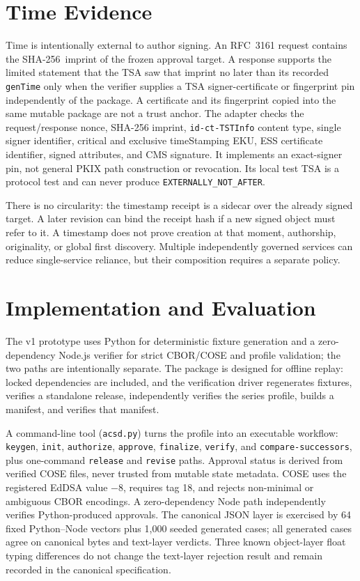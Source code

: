 \documentclass[11pt]{article}
\newcommand{\sha}{\textsf{SHA-256}}
\begin{document}
\section{Time Evidence}

Time is intentionally external to author signing. An RFC~3161 request contains
the \sha\ imprint of the frozen approval target. A response supports the limited
statement that the TSA saw that imprint no later than its recorded
\texttt{genTime} only when the verifier supplies a TSA signer-certificate or
fingerprint pin independently of the package. A certificate and its fingerprint
copied into the same mutable package are not a trust anchor. The adapter checks
the request/response nonce, SHA-256 imprint, \texttt{id-ct-TSTInfo} content type,
single signer identifier, critical and exclusive timeStamping EKU, ESS
certificate identifier, signed attributes, and CMS signature. It implements an
exact-signer pin, not general PKIX path construction or revocation. Its local
test TSA is a protocol test and can never produce
\texttt{EXTERNALLY\_NOT\_AFTER}.

There is no circularity: the timestamp receipt is a sidecar over the already
signed target. A later revision can bind the receipt hash if a new signed object
must refer to it. A timestamp does not prove creation at that moment,
authorship, originality, or global first discovery. Multiple independently
governed services can reduce single-service reliance, but their composition
requires a separate policy.

\section{Implementation and Evaluation}

The v1 prototype uses Python for deterministic fixture generation and a zero-dependency Node.js verifier for strict CBOR/COSE and profile validation; the two paths are intentionally separate. The package is designed for offline replay: locked dependencies are included, and the verification driver regenerates fixtures, verifies a standalone release, independently verifies the series profile, builds a manifest, and verifies that manifest.

A command-line tool (\texttt{acsd.py}) turns the profile into an executable workflow: \texttt{keygen}, \texttt{init}, \texttt{authorize}, \texttt{approve}, \texttt{finalize}, \texttt{verify}, and \texttt{compare-successors}, plus one-command \texttt{release} and \texttt{revise} paths. Approval status is derived from verified COSE files, never trusted from mutable state metadata. COSE uses the registered EdDSA value $-8$, requires tag 18, and rejects non-minimal or ambiguous CBOR encodings. A zero-dependency Node path independently verifies Python-produced approvals. The canonical JSON layer is exercised by 64 fixed Python--Node vectors plus 1,000 seeded generated cases; all generated cases agree on canonical bytes and text-layer verdicts. Three known object-layer float typing differences do not change the text-layer rejection result and remain recorded in the canonical specification.
\end{document}
